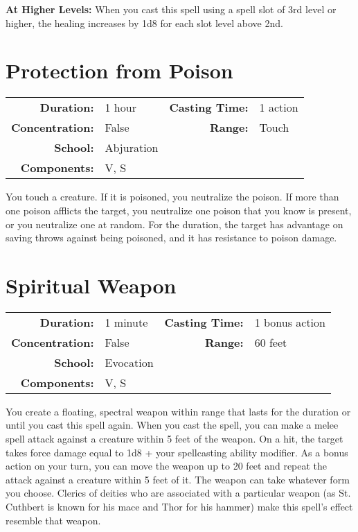 \documentclass[a5paper, 12pt]{memoir}
\begin{document}
\vspace{8pt} \noindent\textbf{At Higher Levels:} When you cast this spell using a spell slot of 3rd level or higher, the healing increases by 1d8 for each slot level above 2nd.
\newpage
\section*{Protection from Poison}

{
\small\centering\vspace{-6pt}
\begin{tabular}{rlrl}
\toprule

\textbf{Duration:} & 1 hour &
\textbf{Casting Time:} & 1 action \\
\textbf{Concentration:} & False &
\textbf{Range:} & Touch \\
\textbf{School:} & Abjuration \\
\textbf{Components:} & \multicolumn{3}{p{0.7\textwidth}}{V, S}\\

\bottomrule
\end{tabular}
}

\vspace{1\baselineskip}\noindent You touch a creature. If it is poisoned, you neutralize the poison. If more than one poison afflicts the target, you neutralize one poison that you know is present, or you neutralize one at random. For the duration, the target has advantage on saving throws against being poisoned, and it has resistance to poison damage.

\newpage
\section*{Spiritual Weapon}

{
\small\centering\vspace{-6pt}
\begin{tabular}{rlrl}
\toprule

\textbf{Duration:} & 1 minute &
\textbf{Casting Time:} & 1 bonus action \\
\textbf{Concentration:} & False &
\textbf{Range:} & 60 feet \\
\textbf{School:} & Evocation \\
\textbf{Components:} & \multicolumn{3}{p{0.7\textwidth}}{V, S}\\

\bottomrule
\end{tabular}
}

\vspace{1\baselineskip}\noindent You create a floating, spectral weapon within range that lasts for the duration or until you cast this spell again. When you cast the spell, you can make a melee spell attack against a creature within 5 feet of the weapon. On a hit, the target takes force damage equal to 1d8 + your spellcasting ability modifier. As a bonus action on your turn, you can move the weapon up to 20 feet and repeat the attack against a creature within 5 feet of it. The weapon can take whatever form you choose. Clerics of deities who are associated with a particular weapon (as St. Cuthbert is known for his mace and Thor for his hammer) make this spell's effect resemble that weapon.
\end{document}
